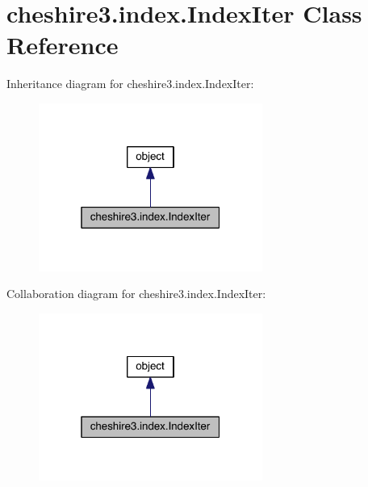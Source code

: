 \hypertarget{classcheshire3_1_1index_1_1_index_iter}{\section{cheshire3.\-index.\-Index\-Iter Class Reference}
\label{classcheshire3_1_1index_1_1_index_iter}
}


Inheritance diagram for cheshire3.\-index.\-Index\-Iter\-:
\nopagebreak
\begin{figure}[H]
\begin{center}
\leavevmode
\includegraphics[width=208pt]{classcheshire3_1_1index_1_1_index_iter__inherit__graph}
\end{center}
\end{figure}


Collaboration diagram for cheshire3.\-index.\-Index\-Iter\-:
\nopagebreak
\begin{figure}[H]
\begin{center}
\leavevmode
\includegraphics[width=208pt]{classcheshire3_1_1index_1_1_index_iter__coll__graph}
\end{center}
\end{figure}
